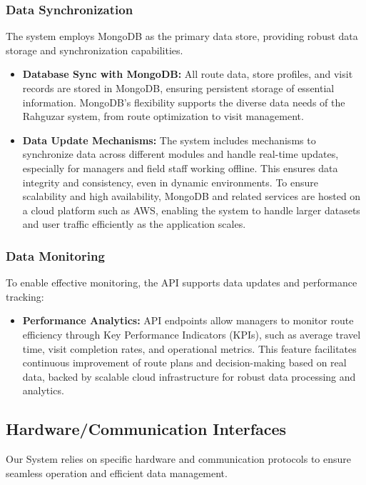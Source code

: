 \subsubsection{Data Synchronization}
The system employs MongoDB as the primary data store, providing robust data storage and synchronization capabilities.
\begin{itemize}
    \item \textbf{Database Sync with MongoDB:} All route data, store profiles, and visit records are stored in MongoDB, ensuring persistent storage of essential information. MongoDB’s flexibility supports the diverse data needs of the Rahguzar system, from route optimization to visit management.
    \item \textbf{Data Update Mechanisms:} The system includes mechanisms to synchronize data across different modules and handle real-time updates, especially for managers and field staff working offline. This ensures data integrity and consistency, even in dynamic environments. To ensure scalability and high availability, MongoDB and related services are hosted on a cloud platform such as AWS, enabling the system to handle larger datasets and user traffic efficiently as the application scales.
\end{itemize}

\subsubsection{Data Monitoring}
To enable effective monitoring, the API supports data updates and performance tracking:
\begin{itemize}
    \item \textbf{Performance Analytics:} API endpoints allow managers to monitor route efficiency through Key Performance Indicators (KPIs), such as average travel time, visit completion rates, and operational metrics. This feature facilitates continuous improvement of route plans and decision-making based on real data, backed by scalable cloud infrastructure for robust data processing and analytics.
\end{itemize}


\subsection{Hardware/Communication Interfaces}
Our System relies on specific hardware and communication protocols to ensure seamless operation and efficient data management.

